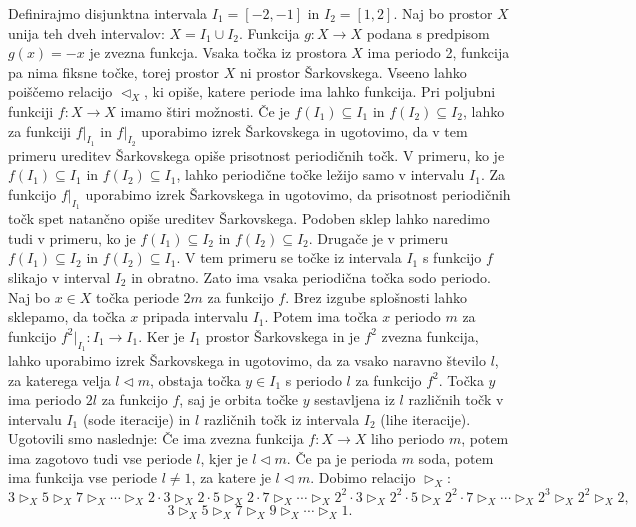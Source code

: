 \documentclass[../TG_magistrsko_delo_sections.tex]{subfiles}
\begin{document}
\begin{primer}
Definirajmo disjunktna intervala $I_1 = [-2, -1]$ in $I_2 = [1, 2]$. Naj bo prostor $X$ unija teh dveh intervalov: $X=I_1 \cup I_2$. Funkcija $g : X \to X$ podana s predpisom $g(x) = -x$ je zvezna funkcja. Vsaka točka iz prostora $X$ ima periodo 2, funkcija pa nima fiksne točke, torej prostor $X$ ni prostor Šarkovskega. Vseeno lahko poiščemo relacijo $\triangleleft_X$, ki opiše, katere periode ima lahko funkcija.  Pri poljubni funkciji $f: X \to X$ imamo štiri možnosti. Če je $f(I_1) \subseteq I_1$ in $f(I_2) \subseteq I_2$, lahko za funkciji $f|_{I_1}$ in $f|_{I_2}$ uporabimo izrek Šarkovskega in ugotovimo, da v tem primeru ureditev Šarkovskega opiše prisotnost periodičnih točk. V primeru, ko je $f(I_1) \subseteq I_1$ in $f(I_2) \subseteq I_1$, lahko periodične točke ležijo samo v intervalu $I_1$. Za funkcijo $f|_{I_1}$ uporabimo izrek Šarkovskega in ugotovimo, da prisotnost periodičnih točk spet natančno opiše ureditev Šarkovskega. Podoben sklep lahko naredimo tudi v primeru, ko je $f(I_1) \subseteq I_2$ in $f(I_2) \subseteq I_2$. Drugače je v primeru $f(I_1) \subseteq I_2$ in $f(I_2) \subseteq I_1$. V tem primeru se točke iz intervala $I_1$ s funkcijo $f$ slikajo v interval $I_2$ in obratno. Zato ima vsaka periodična točka sodo periodo. Naj bo $x \in X$ točka periode $2m$ za funkcijo $f$. Brez izgube splošnosti lahko sklepamo, da točka $x$ pripada intervalu $I_1$. Potem ima točka $x$ periodo $m$ za funkcijo $f^2|_{I_1} :I_1 \to I_1$. Ker je $I_1$ prostor Šarkovskega in je $f^2$ zvezna funkcija, lahko uporabimo izrek Šarkovskega in ugotovimo, da za vsako naravno število $l$, za katerega velja $l \triangleleft m$, obstaja točka $y \in I_1$ s periodo $l$ za funkcijo $f^2$. Točka $y$ ima periodo $2l$ za funkcijo $f$, saj je orbita točke $y$ sestavljena iz $l$ različnih točk v intervalu $I_1$ (sode iteracije) in $l$ različnih točk iz intervala $I_2$ (lihe iteracije). 
Ugotovili smo naslednje: Če ima zvezna funkcija $f:X \to X$ liho periodo $m$, potem ima zagotovo tudi vse periode $l$, kjer je $l \triangleleft m$. Če pa je perioda $m$ soda, potem ima funkcija vse periode $l\neq1$, za katere je $l \triangleleft m$. 
Dobimo relacijo $\triangleright_X$:
$$3 \triangleright_X 5 \triangleright_X 7 \triangleright_X \cdots \triangleright_X 2\cdot 3 \triangleright_X 2\cdot 5 \triangleright_X 2\cdot 7 \triangleright_X \cdots \triangleright_X 2^2\cdot 3 \triangleright_X 2^2\cdot 5 \triangleright_X 2^2\cdot 7 \triangleright_X \cdots \triangleright_X 2^3 \triangleright_X 2^2 \triangleright_X 2,$$
$$3 \triangleright_X 5 \triangleright_X 7 \triangleright_X 9 \triangleright_X  \cdots \triangleright_X 1.$$
\end{primer}
\end{document}
